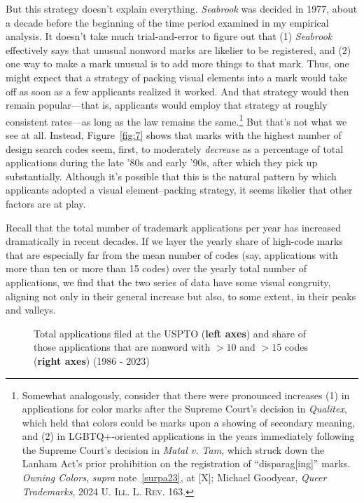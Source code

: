 \documentclass[letterpaper, 11pt, oneside]{article}
\begin{document}
But this strategy doesn't explain everything. \textit{Seabrook} was decided in 1977, about a decade before the beginning of the time period examined in my empirical analysis. It doesn't take much trial-and-error to figure out that (1) \textit{Seabrook} effectively says that unusual nonword marks are likelier to be registered, and (2) one way to make a mark unusual is to add more things to that mark. Thus, one might expect that a strategy of packing visual elements into a mark would take off as soon as a few applicants realized it worked. And that strategy would then remain popular—that is, applicants would employ that strategy at roughly consistent rates—as long as the law remains the same.\footnote{Somewhat analogously, consider that there were pronounced increases (1) in applications for color marks after the Supreme Court's decision in \textit{Qualitex}, which held that colors could be marks upon a showing of secondary meaning, and (2) in LGBTQ+-oriented applications in the years immediately following the Supreme Court's decision in \textit{Matal v. Tam}, which struck down the Lanham Act's prior prohibition on the registration of ``disparag[ing]'' marks. \textit{Owning Colors}, \textit{supra} note~\ref{surpa23}, at [X]; Michael Goodyear, \textit{Queer Trademarks}, 2024 \textsc{U. Ill. L. Rev.} 163.} But that's not what we see at all. Instead, Figure~\ref{fig:7} shows that marks with the highest number of design search codes seem, first, to moderately \textit{decrease} as a percentage of total applications during the late '80s and early '90s, after which they pick up substantially. Although it's possible that this is the natural pattern by which applicants adopted a visual element–packing strategy, it seems likelier that other factors are at play.

Recall that the total number of trademark applications per year has increased dramatically in recent decades. If we layer the yearly share of high-code marks that are especially far from the mean number of codes (say, applications with more than ten or more than 15 codes) over the yearly total number of applications, we find that the two series of data have some visual congruity, aligning not only in their general increase but also, to some extent, in their peaks and valleys.

\addtocounter{figure}{-3}

\begin{figure}[H]
\centering

\caption{\label{fig:12} Total applications filed at the USPTO (\textbf{\color{oxfordblue}left axes}) and share of those applications that are nonword with $>10$ and $>15$ codes (\textbf{\color{seafoam}right axes}) (1986 - 2023)}
\end{figure}
\end{document}
